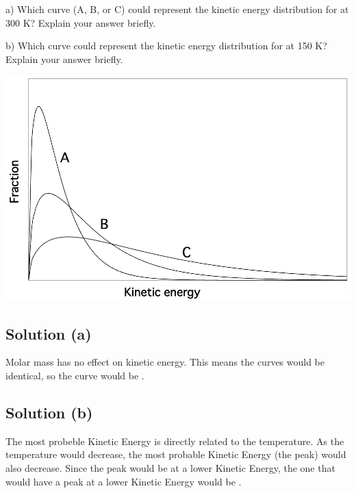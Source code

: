 \documentclass[10pt]{article}
\begin{document}
        a) Which curve (A, B, or C) could represent the kinetic energy distribution for  at 300 K? Explain your answer briefly.

        b) Which curve could represent the kinetic energy distribution for  at 150 K? Explain your answer briefly.

        \begin{center}
            \includegraphics[width=\textwidth]{picture_C-20.png}
        \end{center}

        \subsection{Solution (a)}
            Molar mass has no effect on kinetic energy. 
            This means the curves would be identical, so the curve would be .

        \subsection{Solution (b)}
            The most probeble Kinetic Energy is directly related to the temperature.
            As the temperature would decrease, the most probable Kinetic Energy (the peak) would also decrease.
            Since the peak would be at a lower Kinetic Energy, the one that would have a peak at a lower Kinetic Energy would be .

    \pagebreak
\end{document}
